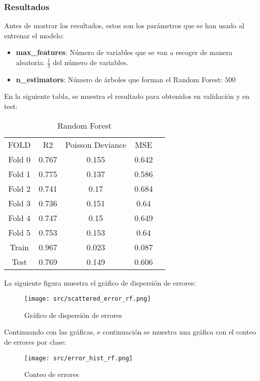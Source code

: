 \subsubsection*{Resultados}
Antes de mostrar los resultados, estos son los parámetros que se han usado al entrenar el modelo:
\begin{itemize}
	\item \textbf{max\_features}: Número de variables que se van a escoger de manera aleatoria: $\frac{1}{3}$ del número de variables.
	      \item\textbf{n\_estimators}: Número de árboles que forman el Random Forest: $500$
\end{itemize}
En la siguiente tabla, se muestra el resultado para obtenidos en validación y en test:
\linebreak
\begin{table}[H]
	\centering
	\begin{tabular}{|c|c|c|c|c}
		\cline{1-4}
		FOLD   & R2    & Poisson Deviance & MSE   \\ \cline{1-4}
		Fold 0 & 0.767 & 0.155            & 0.642 \\ \cline{1-4}
		Fold 1 & 0.775 & 0.137            & 0.586 \\ \cline{1-4}
		Fold 2 & 0.741 & 0.17             & 0.684 \\ \cline{1-4}
		Fold 3 & 0.736 & 0.151            & 0.64  \\ \cline{1-4}
		Fold 4 & 0.747 & 0.15             & 0.649 \\ \cline{1-4}
		Fold 5 & 0.753 & 0.153            & 0.64  \\ \cline{1-4}
		Train  & 0.967 & 0.023            & 0.087 \\ \cline{1-4}
		Test   & 0.769 & 0.149            & 0.606 \\ \cline{1-4}
	\end{tabular}
	\caption{Random Forest}
	\label{tab:res_random_forest}
\end{table}
La siguiente figura muestra el gráfico de dispersión de errores:\\
\linebreak
\begin{figure}[H]
	\centering
	\texttt{[image: src/scattered\_error\_rf.png]}
	\caption{Gráfico de dispersión de errores}
	\label{fig:rf_scattered}
\end{figure}
Continuando con las gráficas, e continuación se muestra una gráfica con el conteo de errores por clase:
\begin{figure}[H]
	\centering
	\texttt{[image: src/error\_hist\_rf.png]}
	\caption{Conteo de errores}
	\label{fig:rf_error_plot}
\end{figure}
